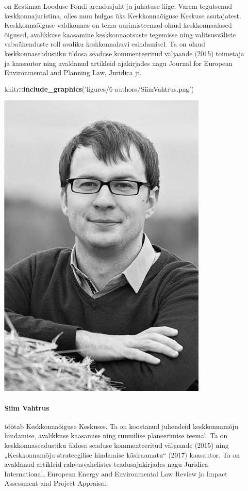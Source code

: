 \documentclass[estonian,]{article}
\newenvironment{Shaded}{\begin{snugshade}}{\end{snugshade}}
\newcommand{\KeywordTok}[1]{\textcolor[rgb]{0.13,0.29,0.53}{\textbf{#1}}}
\newcommand{\NormalTok}[1]{#1}
\newcommand{\OperatorTok}[1]{\textcolor[rgb]{0.81,0.36,0.00}{\textbf{#1}}}
\newcommand{\StringTok}[1]{\textcolor[rgb]{0.31,0.60,0.02}{#1}}
\let\oldparagraph\paragraph
\renewcommand{\paragraph}[1]{\oldparagraph{#1}\mbox{}}
\begin{document}
on Eestimaa Looduse Fondi arendusjuht ja juhatuse liige. Varem tegutsenud keskkonnajuristina, olles muu hulgas üks Keskkonnaõiguse Keskuse asutajatest. Keskkonnaõiguse valdkonnas on tema uurimisteemad olnud keskkonnaalased õigused, avalikkuse kaasamine keskkonnaotsuste tegemisse ning valitsusväliste vabaühenduste roll avaliku keskkonnahuvi esindamisel. Ta on olnud keskkonnaseadustiku üldosa seaduse kommenteeritud väljaande (2015) toimetaja ja kaasautor ning avaldanud artikleid ajakirjades nagu Journal for European Environmental and Planning Law, Juridica jt.

\begin{Shaded}
\begin{Highlighting}[]
\NormalTok{knitr}\OperatorTok{::}\KeywordTok{include_graphics}\NormalTok{(}\StringTok{'figures/6-authors/SiimVahtrus.png'}\NormalTok{)}
\end{Highlighting}
\end{Shaded}

\begin{flushleft}\includegraphics[width=0.5\linewidth]{figures/6-authors/SiimVahtrus} \end{flushleft}

\hypertarget{siim-vahtrus}{%
\paragraph{Siim Vahtrus}\label{siim-vahtrus}}

töötab Keskkonnaõiguse Keskuses. Ta on koostanud juhendeid keskkonnamõju hindamise, avalikkuse kaasamise ning ruumilise planeerimise teemal. Ta on keskkonnaseadustiku üldosa seaduse kommenteeritud väljaande (2015) ning „Keskkonnamõju strateegilise hindamise käsiraamatu`` (2017) kaasautor. Ta on avaldanud artikleid rahvusvahelistes teadusajakirjades nagu Juridica International, European Energy and Environmental Law Review ja Impact Assessment and Project Appraisal.
\end{document}
